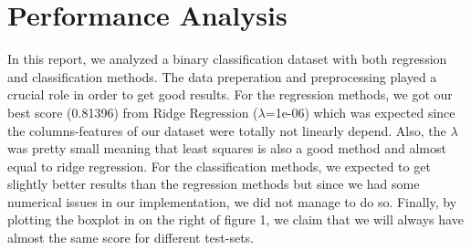 \documentclass[10pt,conference,compsocconf]{IEEEtran}
\begin{document}
\section{Performance Analysis}
In this report, we analyzed a binary classification dataset with both regression and classification methods. The data preperation and preprocessing played a crucial role in order to get good results. For the regression methods, we got our best score (0.81396) from Ridge Regression ($\lambda$=1e-06) which was expected since the columns-features of our dataset were totally not linearly depend. Also, the $\lambda$ was pretty small meaning that least squares is also a good method and almost equal to ridge regression. For the classification methods, we expected to get slightly better results than the regression methods but since we had some numerical issues in our implementation, we did not manage to do so. Finally, by plotting the boxplot in on the right of figure 1, we claim that we will always have almost the same score for different test-sets.

%
%
\end{document}
